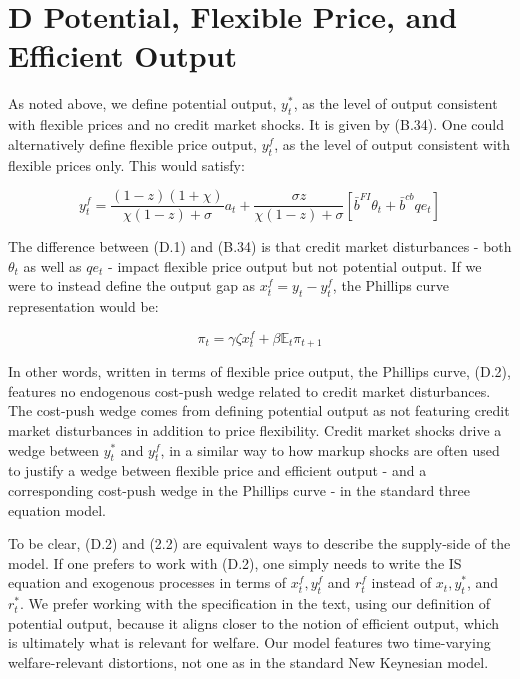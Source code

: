\documentclass[10pt]{article}
\begin{document}
\section*{D Potential, Flexible Price, and Efficient Output}
As noted above, we define potential output, $y_{t}^{*}$, as the level of output consistent with flexible prices and no credit market shocks. It is given by (B.34). One could alternatively define flexible price output, $y_{t}^{f}$, as the level of output consistent with flexible prices only. This would satisfy:

\begin{equation*}
y_{t}^{f}=\frac{(1-z)(1+\chi)}{\chi(1-z)+\sigma} a_{t}+\frac{\sigma z}{\chi(1-z)+\sigma}\left[\bar{b}^{F I} \theta_{t}+\bar{b}^{c b} q e_{t}\right] \tag{D.1}
\end{equation*}

The difference between (D.1) and (B.34) is that credit market disturbances - both $\theta_{t}$ as well as $q e_{t}$ - impact flexible price output but not potential output. If we were to instead define the output gap as $x_{t}^{f}=y_{t}-y_{t}^{f}$, the Phillips curve representation would be:

\begin{equation*}
\pi_{t}=\gamma \zeta x_{t}^{f}+\beta \mathbb{E}_{t} \pi_{t+1} \tag{D.2}
\end{equation*}

In other words, written in terms of flexible price output, the Phillips curve, (D.2), features no endogenous cost-push wedge related to credit market disturbances. The cost-push wedge comes from defining potential output as not featuring credit market disturbances in addition to price flexibility. Credit market shocks drive a wedge between $y_{t}^{*}$ and $y_{t}^{f}$, in a similar way to how markup shocks are often used to justify a wedge between flexible price and efficient output - and a corresponding cost-push wedge in the Phillips curve - in the standard three equation model.

To be clear, (D.2) and (2.2) are equivalent ways to describe the supply-side of the model. If one prefers to work with (D.2), one simply needs to write the IS equation and exogenous processes in terms of $x_{t}^{f}, y_{t}^{f}$ and $r_{t}^{f}$ instead of $x_{t}, y_{t}^{*}$, and $r_{t}^{*}$. We prefer working with the specification in the text, using our definition of potential output, because it aligns closer to the notion of efficient output, which is ultimately what is relevant for welfare. Our model features two time-varying welfare-relevant distortions, not one as in the standard New Keynesian model.
\end{document}
